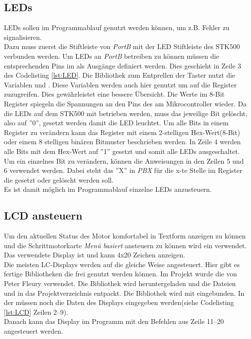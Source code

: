 \subsection{LEDs}
\label{sec:LED}
LEDs sollen im Programmablauf genutzt werden können, um z.B. Fehler zu signalisieren.\\
Dazu muss zuerst die Stiftleiste von \emph{PortB} mit der LED Stiftleiste des STK500 verbunden werden. Um LEDs an \emph{PortB} betreiben zu können müssen die entsprechenden Pins im   als Ausgänge definiert werden. Dies geschieht in Zeile 3 des Codelisting \ref{lst:LED}. Die Bibliothek zum Entprellen der Taster nutzt die Variablen  und . Diese Variablen werden auch hier genutzt um auf die Register zuzugreifen. Dies gewährleistet eine bessere Übersicht. Die Werte im 8-Bit Register  spiegeln die Spannungen an den Pins des  am Mikrocontroller wieder. Da die LEDs auf dem STK500 mit  betrieben werden, muss das jeweilige Bit gelöscht, also auf ''0'', gesetzt werden damit die LED leuchtet. Um alle Bits in einem Register zu verändern kann das Register mit einem 2-stelligen Hex-Wert(8-Bit) oder einem 8 stelligen binären Bitmuster beschrieben werden. In Zeile 4 werden alle Bits mit dem Hex-Wert  auf ''1'' gesetzt und somit alle LEDs ausgeschaltet. Um ein einzelnes Bit zu verändern, können die Anweisungen in den Zeilen 5 und 6 verwendet werden. Dabei steht das ''X'' in \emph{PBX} für die x-te Stelle im Register die gesetzt oder gelöscht werden soll.\\
Es ist damit möglich im Programmablauf einzelne LEDs anzusteuern.
\lstset{language=C, basicstyle=\footnotesize, showstringspaces=false, tabsize=8}


\subsection{LCD ansteuern}
\label{sec:LCD}
Um den aktuellen Status des Motor komfortabel in Textform anzeigen zu können und die Schrittmotorkarte \emph{Menü basiert} ansteuern zu können wird ein  verwendet. Das verwendete Display ist  und kann 4x20 Zeichen anzeigen.\\
Die meisten LC-Displays werden auf die gleiche Weise angesteuert. Hier gibt es fertige Bibliotheken die frei genutzt werden können. Im Projekt wurde die von Peter Fleury \cite{uC:Fleury} verwendet. Die Bibliothek wird heruntergeladen und die Dateien  und  in das Projektverzeichnis entpackt. Die Bibliothek wird mit  eingebunden. In der  müssen noch die Daten des Displays eingegeben werden(siehe Codelisting \ref{lst:LCD} Zeilen 2--9).\\
Danach kann das Display im Programm mit den Befehlen aus Zeile 11--20 angesteuert werden.
\lstset{language=C, basicstyle=\footnotesize, showstringspaces=false, tabsize=8}


